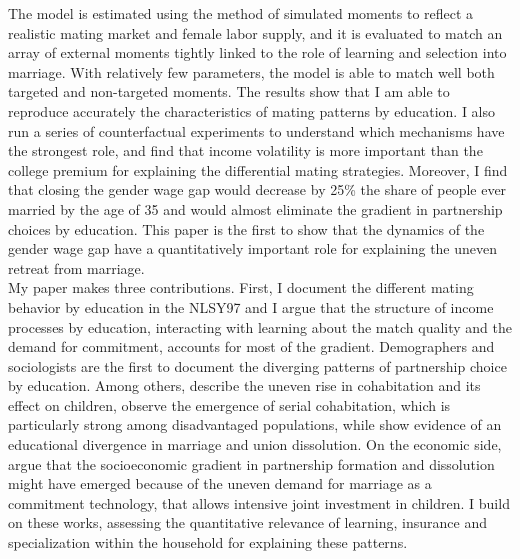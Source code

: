 \documentclass[12pt]{article}
\begin{document}
 The model is estimated using the method of simulated moments to reflect a realistic mating market and female labor supply, and it is evaluated to match an array of external moments tightly linked to the role of learning and selection into marriage. With relatively few parameters, the model is able to match well both targeted and non-targeted moments. The results show that I am able to reproduce accurately the characteristics of mating patterns by education. I also run a series of counterfactual experiments to understand which mechanisms have the strongest role, and find that income volatility is more important than the college premium for explaining the differential mating strategies. Moreover, I find that closing the gender wage gap would decrease by 25\% the share of people ever married by the age of 35 and would almost eliminate the gradient in partnership choices by education. This paper is the first to show that the dynamics of the gender wage gap have a quantitatively important role for explaining the uneven retreat from marriage.  \\
 
 My paper makes three contributions. First, I document the different mating behavior by education in the NLSY97 and I argue that the structure of income processes by education, interacting with learning about the match quality and the demand for commitment, accounts for most of the gradient. Demographers and sociologists are the first to document the diverging patterns of partnership choice by education. Among others, \citet{bumpass2000} describe the uneven rise in cohabitation and its effect on children, \citet{lichter2010} observe the emergence of serial cohabitation, which is particularly strong among disadvantaged populations, while \citet{perelli2016} show evidence of an educational divergence in marriage and union dissolution. On the economic side,  \citet{lundberg2016} argue that the socioeconomic gradient in partnership formation and dissolution might have emerged because of the uneven demand for marriage as a commitment technology, that allows intensive joint investment in children. I build on these works, assessing the quantitative relevance of learning, insurance and specialization within the household for explaining these patterns.
 
\end{document}
